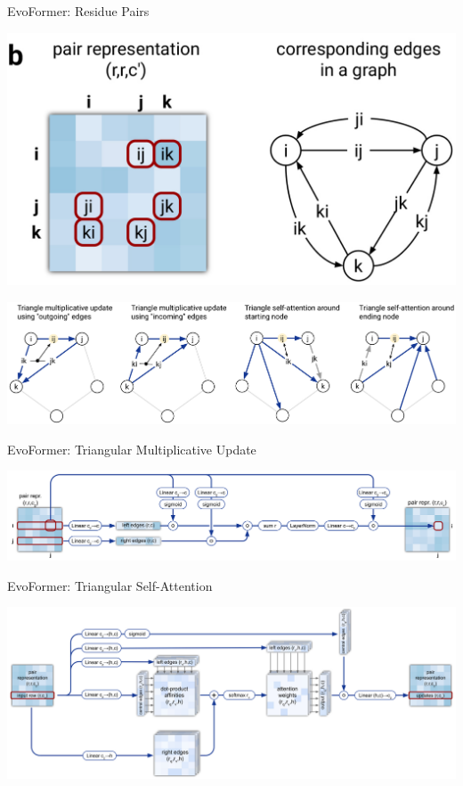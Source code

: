 \documentclass[presentation, smaller]{beamer}
\begin{document}
\begin{frame}[label={sec:org59b1a86}]{EvoFormer: Residue Pairs \cite{jumperHighlyAccurateProtein2021}}
\begin{center}
\includegraphics[scale=0.25]{./imgs/model-evoformer-pair1.png}
\end{center}
\begin{center}
\includegraphics[width=.9\linewidth]{./imgs/model-evoformer-pair2.png}
\end{center}
\end{frame}

\begin{frame}[label={sec:orgf150cd4}]{EvoFormer: Triangular Multiplicative Update \cite{jumperHighlyAccurateProtein2021}}
\begin{center}
\includegraphics[width=.9\linewidth]{./imgs/triangular-mult-update.png}
\end{center}
\end{frame}

\begin{frame}[label={sec:org8ee6e22}]{EvoFormer: Triangular Self-Attention \cite{jumperHighlyAccurateProtein2021}}
\begin{center}
\includegraphics[width=.9\linewidth]{./imgs/triangular-self-attention.png}
\end{center}
\end{frame}
\end{document}
